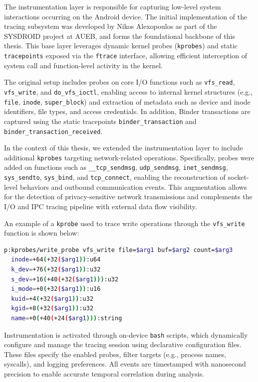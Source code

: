 \documentclass[a4paper,12pt]{report}
\begin{document}
The instrumentation layer is responsible for capturing low-level system interactions occurring on the Android device. The initial implementation of the tracing subsystem was developed by Nikos Alexopoulos as part of the SYSDROID project at AUEB, and forms the foundational backbone of this thesis. This base layer leverages dynamic kernel probes (\texttt{kprobes}) and static \texttt{tracepoints} exposed via the \texttt{ftrace} interface, allowing efficient interception of system call and function-level activity in the kernel.

The original setup includes probes on core I/O functions such as \texttt{vfs\_read}, \texttt{vfs\_write}, and \texttt{do\_vfs\_ioctl}, enabling access to internal kernel structures (e.g., \texttt{file}, \texttt{inode}, \texttt{super\_block}) and extraction of metadata such as device and inode identifiers, file types, and access credentials. In addition, Binder transactions are captured using the static tracepoints \texttt{binder\_transaction} and \texttt{binder\_transaction\_received}.

In the context of this thesis, we extended the instrumentation layer to include additional \texttt{kprobes} targeting network-related operations. Specifically, probes were added on functions such as \texttt{\_\_tcp\_sendmsg}, \texttt{udp\_sendmsg}, \texttt{inet\_sendmsg}, \texttt{sys\_sendto}, \texttt{sys\_bind}, and \texttt{tcp\_connect}, enabling the reconstruction of socket-level behaviors and outbound communication events. This augmentation allows for the detection of privacy-sensitive network transmissions and complements the I/O and IPC tracing pipeline with external data flow visibility.

An example of a \texttt{kprobe} used to trace write operations through the \texttt{vfs\_write} function is shown below:

\begin{lstlisting}[language=bash,caption={Example kprobe for vfs\_write in tracefs syntax}]
p:kprobes/write_probe vfs_write file=$arg1 buf=$arg2 count=$arg3
  inode=+64(+32($arg1)):u64
  k_dev=+76(+32($arg1)):u32
  s_dev=+16(+40(+32($arg1))):u32
  i_mode=+0(+32($arg1)):u16
  kuid=+4(+32($arg1)):u32
  kgid=+8(+32($arg1)):u32
  name=+0(+40(+24($arg1))):string
\end{lstlisting}

Instrumentation is activated through on-device \texttt{bash} scripts, which dynamically configure and manage the tracing session using declarative configuration files. These files specify the enabled probes, filter targets (e.g., process names, syscalls), and logging preferences. All events are timestamped with nanosecond precision to enable accurate temporal correlation during analysis.
\end{document}
